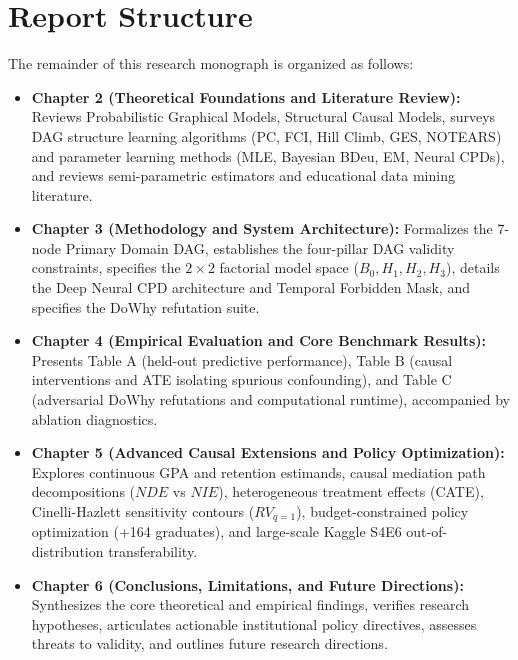 \section{Report Structure}
\label{sec:intro_structure}

The remainder of this research monograph is organized as follows:
\begin{itemize}
    \item \textbf{Chapter 2 (Theoretical Foundations and Literature Review):} Reviews Probabilistic Graphical Models, Structural Causal Models, surveys DAG structure learning algorithms (PC, FCI, Hill Climb, GES, NOTEARS) and parameter learning methods (MLE, Bayesian BDeu, EM, Neural CPDs), and reviews semi-parametric estimators and educational data mining literature.
    \item \textbf{Chapter 3 (Methodology and System Architecture):} Formalizes the 7-node Primary Domain DAG, establishes the four-pillar DAG validity constraints, specifies the $2 \times 2$ factorial model space ($B_0, H_1, H_2, H_3$), details the Deep Neural CPD architecture and Temporal Forbidden Mask, and specifies the DoWhy refutation suite.
    \item \textbf{Chapter 4 (Empirical Evaluation and Core Benchmark Results):} Presents Table A (held-out predictive performance), Table B (causal interventions and ATE isolating spurious confounding), and Table C (adversarial DoWhy refutations and computational runtime), accompanied by ablation diagnostics.
    \item \textbf{Chapter 5 (Advanced Causal Extensions and Policy Optimization):} Explores continuous GPA and retention estimands, causal mediation path decompositions ($NDE$ vs $NIE$), heterogeneous treatment effects (CATE), Cinelli-Hazlett sensitivity contours ($RV_{q=1}$), budget-constrained policy optimization (+164 graduates), and large-scale Kaggle S4E6 out-of-distribution transferability.
    \item \textbf{Chapter 6 (Conclusions, Limitations, and Future Directions):} Synthesizes the core theoretical and empirical findings, verifies research hypotheses, articulates actionable institutional policy directives, assesses threats to validity, and outlines future research directions.
\end{itemize}
